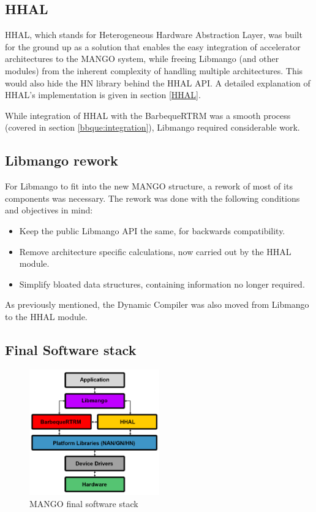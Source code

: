 \subsection{HHAL}

HHAL, which stands for Heterogeneous Hardware Abstraction Layer, was built for the ground up as a solution that enables the easy integration of accelerator architectures to the MANGO system, while freeing Libmango (and other modules) from the inherent complexity of handling multiple architectures. This would also hide the HN library behind the HHAL API.
A detailed explanation of HHAL's implementation is given in section \ref{HHAL}.

While integration of HHAL with the BarbequeRTRM was a smooth process (covered in section \ref{bbque:integration}), Libmango required considerable work.

\subsection{Libmango rework}

For Libmango to fit into the new MANGO structure, a rework of most of its components was necessary. The rework was done with the following conditions and objectives in mind:
\begin{itemize}
    \item Keep the public Libmango API the same, for backwards compatibility.
    \item Remove architecture specific calculations, now carried out by the HHAL module.
    \item Simplify bloated data structures, containing information no longer required.
\end{itemize}

As previously mentioned, the Dynamic Compiler was also moved from Libmango to the HHAL module.

\subsection{Final Software stack}

\begin{figure}[ht]
    \centering
    \includegraphics[width=0.5\textwidth]{img/mango-final-stack.png}
    \captionsetup{justification=centering}
    \caption{MANGO final software stack}
    \label{fig:mango_final_stack}
\end{figure}

